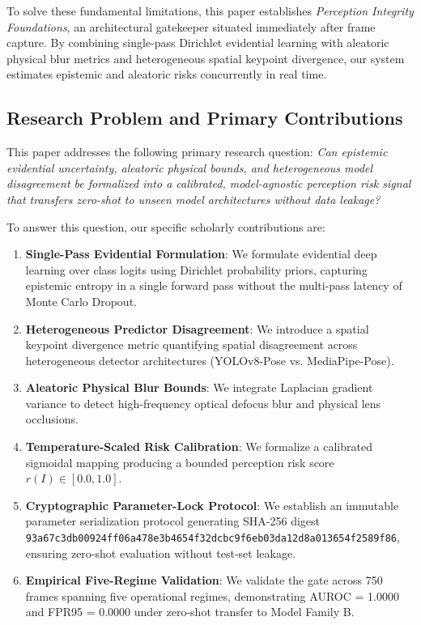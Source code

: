 \documentclass[conference]{IEEEtran}
\begin{document}
To solve these fundamental limitations, this paper establishes \textit{Perception Integrity Foundations}, an architectural gatekeeper situated immediately after frame capture. By combining single-pass Dirichlet evidential learning with aleatoric physical blur metrics and heterogeneous spatial keypoint divergence, our system estimates epistemic and aleatoric risks concurrently in real time.

\subsection{Research Problem and Primary Contributions}
This paper addresses the following primary research question: \textit{Can epistemic evidential uncertainty, aleatoric physical bounds, and heterogeneous model disagreement be formalized into a calibrated, model-agnostic perception risk signal that transfers zero-shot to unseen model architectures without data leakage?}

To answer this question, our specific scholarly contributions are:
\begin{enumerate}
    \item \textbf{Single-Pass Evidential Formulation}: We formulate evidential deep learning over class logits using Dirichlet probability priors, capturing epistemic entropy in a single forward pass without the multi-pass latency of Monte Carlo Dropout.
    \item \textbf{Heterogeneous Predictor Disagreement}: We introduce a spatial keypoint divergence metric quantifying spatial disagreement across heterogeneous detector architectures (YOLOv8-Pose vs. MediaPipe-Pose).
    \item \textbf{Aleatoric Physical Blur Bounds}: We integrate Laplacian gradient variance to detect high-frequency optical defocus blur and physical lens occlusions.
    \item \textbf{Temperature-Scaled Risk Calibration}: We formalize a calibrated sigmoidal mapping producing a bounded perception risk score $r(I) \in [0.0, 1.0]$.
    \item \textbf{Cryptographic Parameter-Lock Protocol}: We establish an immutable parameter serialization protocol generating SHA-256 digest \texttt{93a67c3db00924ff06a478e3b4654f32dcbc9f6eb03da12d8a013654f2589f86}, ensuring zero-shot evaluation without test-set leakage.
    \item \textbf{Empirical Five-Regime Validation}: We validate the gate across 750 frames spanning five operational regimes, demonstrating AUROC = 1.0000 and FPR95 = 0.0000 under zero-shot transfer to Model Family B.
\end{enumerate}
\end{document}
